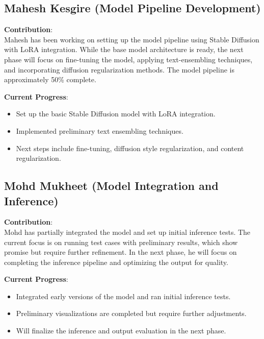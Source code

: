 \documentclass{exam}
\begin{document}
\vspace{0.2in}

\subsection{Mahesh Kesgire (Model Pipeline Development)}
\textbf{Contribution}: \\
Mahesh has been working on setting up the model pipeline using Stable Diffusion with LoRA integration. While the base model architecture is ready, the next phase will focus on fine-tuning the model, applying text-ensembling techniques, and incorporating diffusion regularization methods. The model pipeline is approximately 50\% complete.

\textbf{Current Progress}: 
\begin{itemize}
    \item Set up the basic Stable Diffusion model with LoRA integration.
    \item Implemented preliminary text ensembling techniques.
    \item Next steps include fine-tuning, diffusion style regularization, and content regularization.
\end{itemize}

\vspace{0.2in}

\subsection{Mohd Mukheet (Model Integration and Inference)}
\textbf{Contribution}: \\
Mohd has partially integrated the model and set up initial inference tests. The current focus is on running test cases with preliminary results, which show promise but require further refinement. In the next phase, he will focus on completing the inference pipeline and optimizing the output for quality.

\textbf{Current Progress}: 
\begin{itemize}
    \item Integrated early versions of the model and ran initial inference tests.
    \item Preliminary visualizations are completed but require further adjustments.
    \item Will finalize the inference and output evaluation in the next phase.
\end{itemize}

\vspace{0.2in}
\end{document}
